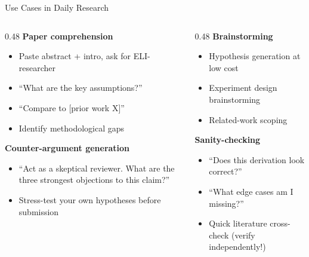 \begin{frame}{Use Cases in Daily Research}
  \begin{columns}[T, onlytextwidth]
    \begin{column}{0.48\textwidth}
      \textbf{Paper comprehension}\\
      \begin{itemize}
        \item Paste abstract + intro, ask for ELI-researcher
        \item ``What are the key assumptions?''
        \item ``Compare to [prior work X]''
        \item Identify methodological gaps
      \end{itemize}
      \vspace{0.6em}
      \textbf{Counter-argument generation}\\
      \begin{itemize}
        \item ``Act as a skeptical reviewer. What are the three strongest objections to this claim?''
        \item Stress-test your own hypotheses before submission
      \end{itemize}
    \end{column}
    \hfill
    \begin{column}{0.48\textwidth}
      \textbf{Brainstorming}\\
      \begin{itemize}
        \item Hypothesis generation at low cost
        \item Experiment design brainstorming
        \item Related-work scoping
      \end{itemize}
      \vspace{0.6em}
      \textbf{Sanity-checking}\\
      \begin{itemize}
        \item ``Does this derivation look correct?''
        \item ``What edge cases am I missing?''
        \item Quick literature cross-check (verify independently!)
      \end{itemize}
    \end{column}
  \end{columns}
\end{frame}

